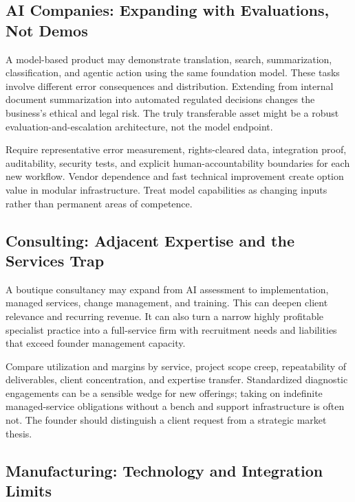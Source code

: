 \subsection{AI Companies: Expanding with Evaluations, Not Demos}
\label{sec:ai_companies_evaluation_not_demo}

A model-based product may demonstrate translation, search, summarization, classification, and agentic action using the same foundation model. These tasks involve different error consequences and distribution. Extending from internal document summarization into automated regulated decisions changes the business's ethical and legal risk. The truly transferable asset might be a robust evaluation-and-escalation architecture, not the model endpoint.

Require representative error measurement, rights-cleared data, integration proof, auditability, security tests, and explicit human-accountability boundaries for each new workflow. Vendor dependence and fast technical improvement create option value in modular infrastructure. Treat model capabilities as changing inputs rather than permanent areas of competence.

\subsection{Consulting: Adjacent Expertise and the Services Trap}
\label{sec:consulting_adjacent_expertise_trap}

A boutique consultancy may expand from AI assessment to implementation, managed services, change management, and training. This can deepen client relevance and recurring revenue. It can also turn a narrow highly profitable specialist practice into a full-service firm with recruitment needs and liabilities that exceed founder management capacity.

Compare utilization and margins by service, project scope creep, repeatability of deliverables, client concentration, and expertise transfer. Standardized diagnostic engagements can be a sensible wedge for new offerings; taking on indefinite managed-service obligations without a bench and support infrastructure is often not. The founder should distinguish a client request from a strategic market thesis.

\subsection{Manufacturing: Technology and Integration Limits}
\label{sec:manufacturing_technology_integration_limits}

